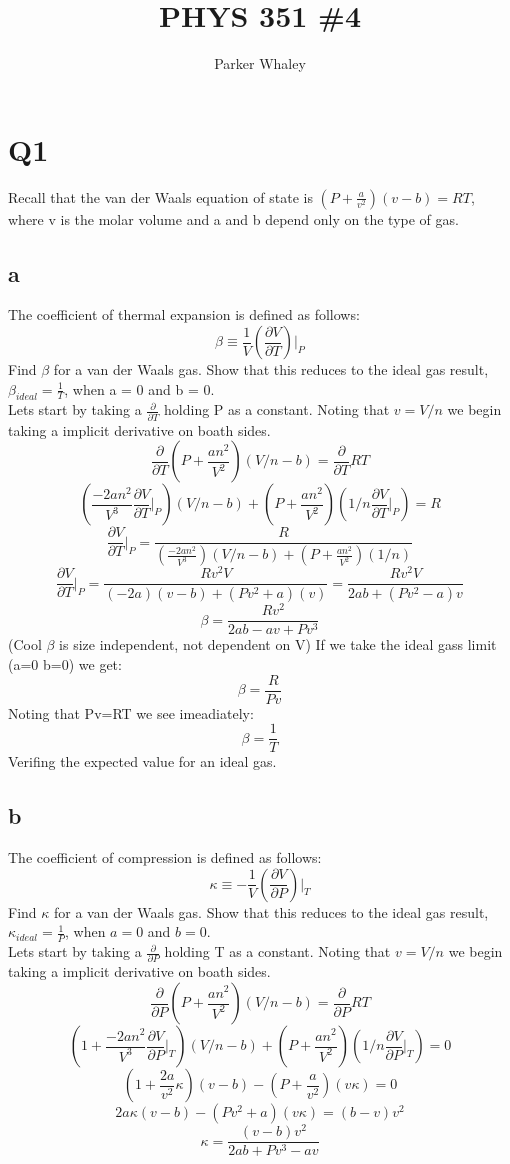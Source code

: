 \documentclass[10pt,a4paper]{article}
\author{Parker Whaley}
\title{PHYS 351 \#4}
\begin{document}
\maketitle

\section{Q1}
Recall that the van der Waals equation of state is $(P +\frac{a}{v^2} )(v - b) = RT$, where v is
the molar volume and a and b depend only on the type of gas.
\subsection{a}
The coefficient of thermal expansion is defined as follows:
\[\beta \equiv \frac{1}{V}(\frac{\partial V}{\partial T})\biggr |_P\]
Find $\beta$ for a van der Waals gas. Show that this reduces to the ideal gas result, $\beta_{ideal} =\frac{1}{T}$, when a = 0 and b = 0.\\

Lets start by taking a $\frac{\partial}{\partial T}$ holding P as a constant.  Noting that $v=V/n$ we begin taking a implicit derivative on boath sides.
\[\frac{\partial}{\partial T}(P +\frac{an^2}{V^2} )(V/n - b) = \frac{\partial}{\partial T}RT\]
\[(\frac{-2an^2}{V^3}\frac{\partial V}{\partial T}\biggr |_P )(V/n - b)+(P +\frac{an^2}{V^2} )(1/n\frac{\partial V}{\partial T}\biggr |_P) = R\]
\[\frac{\partial V}{\partial T}\biggr |_P =\frac{R}{(\frac{-2an^2}{V^3})(V/n - b)+(P +\frac{an^2}{V^2} )(1/n)}\]
\[\frac{\partial V}{\partial T}\biggr |_P =\frac{Rv^2V}{(-2a)(v - b)+(Pv^2 +a )(v)}=  \frac{Rv^2V}{2ab+(Pv^2-a)v}\]
\[\beta=\frac{Rv^2}{2ab-av+Pv^3}\]
(Cool $\beta$ is size independent, not dependent on V)  If we take the ideal gass limit (a=0 b=0) we get:
\[\beta=\frac{R}{Pv}\]
Noting that Pv=RT we see imeadiately:
\[\beta=\frac{1}{T}\]
Verifing the expected value for an ideal gas.
\subsection{b}
The coefficient of compression is defined as follows:
\[\kappa \equiv -\frac{1}{V}(\frac{\partial V}{\partial P})\biggr |_T\]
Find $\kappa$ for a van der Waals gas. Show that this reduces to the ideal gas result, $\kappa_{ideal} =\frac{1}{P}$, when $a = 0$ and $b = 0$.\\

Lets start by taking a $\frac{\partial}{\partial P}$ holding T as a constant.  Noting that $v=V/n$ we begin taking a implicit derivative on boath sides.
\[\frac{\partial}{\partial P}(P +\frac{an^2}{V^2} )(V/n - b) = \frac{\partial}{\partial P}RT\]
\[(1 +\frac{-2an^2}{V^3}\frac{\partial V}{\partial P}\biggr |_T )(V/n - b) + (P +\frac{an^2}{V^2} )(1/n\frac{\partial V}{\partial P}\biggr |_T) = 0\]
\[(1 +\frac{2a}{v^2}\kappa )(v - b) - (P +\frac{a}{v^2} )(v\kappa) = 0\]
\[2a\kappa (v - b) - (Pv^2 +a )(v\kappa) = (b - v)v^2\]
\[\kappa = \frac{(v - b)v^2}{ 2ab + Pv^3 -av }\]
\end{document}
